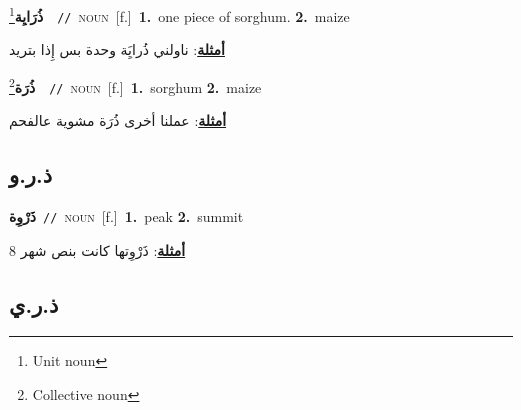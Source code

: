 \documentclass[10pt,a4paper,twoside]{article} %
\begin{document}
\begin{multicols}{2}
{\setlength\topsep{0pt}\textbf{\foreignlanguage{arabic}{ذُرَايِة}}\footnote{Unit noun}\ \ {\color{gray}\texttt{//}\color{black}}\ \textsc{noun}\ [f.]\ \textbf{1.}~one piece of sorghum.  \textbf{2.}~maize\  \begin{flushright}\color{gray}\foreignlanguage{arabic}{\textbf{\underline{\foreignlanguage{arabic}{أمثلة}}}: ناولني ذُرايَِة وحدة بس إِذا بتريد}\end{flushright}\color{black}} \vspace{2mm}

{\setlength\topsep{0pt}\textbf{\foreignlanguage{arabic}{ذُرَة}}\footnote{Collective noun}\ \ {\color{gray}\texttt{//}\color{black}}\ \textsc{noun}\ [f.]\ \textbf{1.}~sorghum  \textbf{2.}~maize\  \begin{flushright}\color{gray}\foreignlanguage{arabic}{\textbf{\underline{\foreignlanguage{arabic}{أمثلة}}}: عملنا  أخرى ذُرَة مشوية عالفحم}\end{flushright}\color{black}} \vspace{2mm}

\vspace{-3mm}
\subsection*{\color{blue}\foreignlanguage{arabic}{ذ.ر.و}\color{blue}{}} 

{\setlength\topsep{0pt}\textbf{\foreignlanguage{arabic}{ذَرْوِة}}\ {\color{gray}\texttt{//}\color{black}}\ \textsc{noun}\ [f.]\ \textbf{1.}~peak  \textbf{2.}~summit\  \begin{flushright}\color{gray}\foreignlanguage{arabic}{\textbf{\underline{\foreignlanguage{arabic}{أمثلة}}}: ذَرْوِتها كانت بنص شهر 8}\end{flushright}\color{black}} \vspace{2mm}

\vspace{-3mm}
\subsection*{\color{blue}\foreignlanguage{arabic}{ذ.ر.ي}\color{blue}{}} 


\end{multicols}
\end{document}
